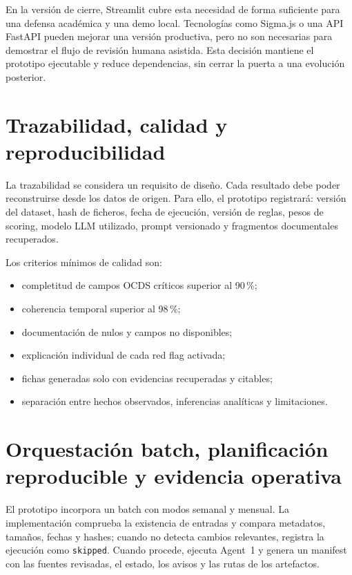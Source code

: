 \documentclass[11pt,a4paper,spanish]{book}
\numberwithin{equation}{chapter}
\numberwithin{figure}{chapter}
\begin{document}
En la versi{\'o}n de cierre, Streamlit cubre esta necesidad de forma suficiente para una defensa
acad{\'e}mica y una demo local. Tecnolog{\'i}as como Sigma.js o una API FastAPI pueden mejorar una
versi{\'o}n productiva, pero no son necesarias para demostrar el flujo de revisi{\'o}n humana asistida.
Esta decisi{\'o}n mantiene el prototipo ejecutable y reduce dependencias, sin cerrar la puerta a una
evoluci{\'o}n posterior.

\section{Trazabilidad, calidad y reproducibilidad}
\label{sec:trazabilidad_cap6}

La trazabilidad se considera un requisito de dise{\~n}o. Cada resultado debe poder reconstruirse desde los datos de origen. Para ello, el prototipo registrar{\'a}: versi{\'o}n del dataset, hash de ficheros, fecha de ejecuci{\'o}n, versi{\'o}n de reglas, pesos de scoring, modelo LLM utilizado, prompt versionado y fragmentos documentales recuperados.

Los criterios m{\'i}nimos de calidad son:

\begin{itemize}
  \item completitud de campos OCDS cr{\'i}ticos superior al 90\,\%;
  \item coherencia temporal superior al 98\,\%;
  \item documentaci{\'o}n de nulos y campos no disponibles;
  \item explicaci{\'o}n individual de cada red flag activada;
  \item fichas generadas solo con evidencias recuperadas y citables;
  \item separaci{\'o}n entre hechos observados, inferencias anal{\'i}ticas y limitaciones.
\end{itemize}

\section{Orquestaci{\'o}n batch, planificaci{\'o}n reproducible y evidencia operativa}
\label{sec:batch_freeze_cap6}

El prototipo incorpora un batch con modos semanal y mensual. La implementaci{\'o}n comprueba la
existencia de entradas y compara metadatos, tama{\~n}os, fechas y hashes; cuando no detecta cambios
relevantes, registra la ejecuci{\'o}n como \texttt{skipped}. Cuando procede, ejecuta Agent~1 y genera
un manifest con las fuentes revisadas, el estado, los avisos y las rutas de los artefactos.
\end{document}
